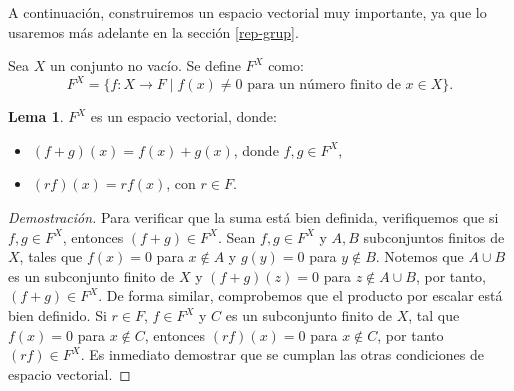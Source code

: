 \documentclass[12pt]{book}
\theoremstyle{definition}
\newtheorem{lemma}[theorem]{Lema}
\newcounter{in}
\newcounter{ini}
\begin{document}
A continuación, construiremos un espacio vectorial muy importante, ya
que lo usaremos más adelante en la sección \ref{rep-grup}.

Sea $X$ un conjunto no vacío. Se define $F^{X}$ como:
\begin{equation*}
  F^{X}=\{f:X\rightarrow F\mid f(x)\neq 0 \mbox{ para un número finito
    de } x\in X\}.
\end{equation*}

\begin{lemma}
  \label{FX}
  $F^{X}$ es un espacio vectorial, donde:
  \begin{itemize}
  \item $(f+g)(x)=f(x)+g(x)$, donde $f,g\in F^{X}$,
  \item $(rf)(x)=rf(x)$, con $r\in F$.
  \end{itemize}
\end{lemma}

\begin{proof}[Demostración]
  Para verificar que la suma está bien definida, verifiquemos que si
  $f,g\in F^{X}$, entonces $(f+g) \in F^{X}$. Sean $f,g\in F^{X}$ y $A,B$
  subconjuntos finitos de $X$, tales que $f(x)=0$ para $x\not\in A$ y
  $g(y)=0$ para $y\not\in B$. Notemos que $A\cup B$ es un
  subconjunto finito de $X$ y $(f+g)(z)=0$ para $z\not\in A\cup
  B$, por tanto, $(f+g) \in F^{X}$. De forma similar, comprobemos que el
  producto por escalar está bien definido. Si $r\in F$, $f\in F^{X}$ y
  $C$ es un subconjunto finito de $X$, tal que $f(x)=0$ para $x\not\in
  C$, entonces $(rf)(x)=0$ para $x\not\in C$, por tanto~$(rf)\in
  F^{X}$. Es inmediato demostrar que se cumplan las otras condiciones de
  espacio vectorial.
\end{proof}
\end{document}
